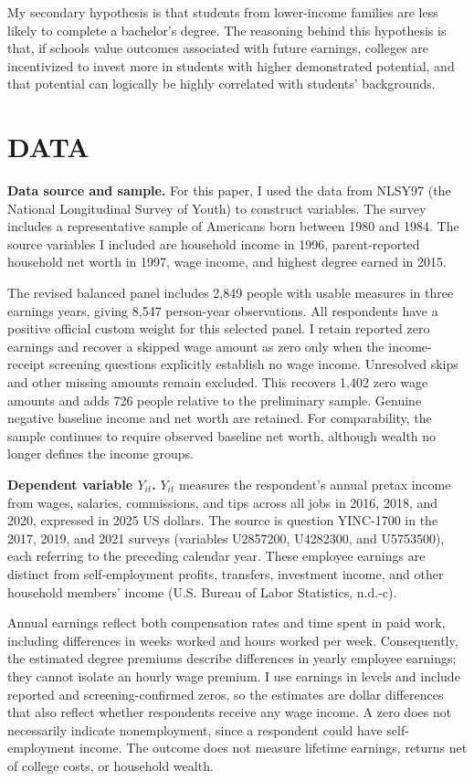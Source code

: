 \documentclass[12pt,letterpaper]{article}
\begin{document}
My secondary hypothesis is that students from lower-income families are less likely to
complete a bachelor's degree. The reasoning behind this hypothesis is that, if schools
value outcomes associated with future earnings, colleges are incentivized to invest more
in students with higher demonstrated potential, and that potential can logically be
highly correlated with students' backgrounds.

\section*{DATA}
\textbf{Data source and sample.}
For this paper, I used the data from NLSY97 (the National Longitudinal Survey of Youth)
to construct variables. The survey includes a representative sample of Americans born
between 1980 and 1984. The source variables I included are household income in 1996,
parent-reported household net worth in 1997, wage income, and highest degree earned in 2015.

The revised balanced panel includes 2,849 people with usable measures in three
earnings years, giving 8,547 person-year observations. All respondents have a positive
official custom weight for this selected panel. I retain reported zero earnings and
recover a skipped wage amount as zero only when the income-receipt screening
questions explicitly establish no wage income. Unresolved skips and other missing
amounts remain excluded. This recovers 1,402 zero wage amounts and adds 726 people
relative to the preliminary sample. Genuine negative baseline income and net worth
are retained. For comparability, the sample continues to require observed baseline
net worth, although wealth no longer defines the income groups.

\textbf{Dependent variable $Y_{it}$.}
$Y_{it}$ measures the respondent's annual pretax income from wages, salaries,
commissions, and tips across all jobs in 2016, 2018, and 2020, expressed in 2025
US dollars. The source is question YINC-1700 in the 2017, 2019, and 2021 surveys
(variables U2857200, U4282300, and U5753500), each referring to the preceding
calendar year. These employee earnings are distinct from self-employment profits,
transfers, investment income, and other household members' income (U.S. Bureau
of Labor Statistics, n.d.-c).

Annual earnings reflect both compensation rates and time spent in paid work,
including differences in weeks worked and hours worked per week. Consequently,
the estimated degree premiums describe differences in yearly employee earnings;
they cannot isolate an hourly wage premium. I use earnings in levels and include
reported and screening-confirmed zeros, so the estimates are dollar differences
that also reflect whether respondents receive any wage income. A zero does not
necessarily indicate nonemployment, since a respondent could have self-employment
income. The outcome does not measure lifetime earnings, returns net of college
costs, or household wealth.
\end{document}
